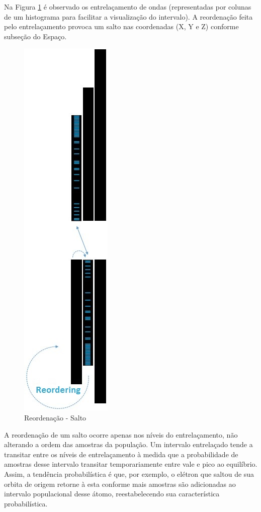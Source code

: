 Na Figura \ref{fig:consciousness_space_subconscious_observation_jump} é observado os entrelaçamento de ondas (representadas por colunas de um histograma para facilitar a visualização do intervalo). A reordenação feita pelo entrelaçamento provoca um salto nas coordenadas (X, Y e Z) conforme subseção do Espaço.
	\begin{figure}[H]
	\caption{Reordenação - Salto}
	\label{fig:consciousness_space_subconscious_observation_jump}
	\centering
	\includegraphics[scale=.53]{sections/images/consciousness_space_subconscious_observation_jump.jpg}
	\end{figure}

A reordenação de um salto ocorre apenas nos níveis do entrelaçamento, não alterando a ordem das amostras da população. Um intervalo entrelaçado tende a transitar entre os níveis de entrelaçamento à medida que a probabilidade de amostras desse intervalo transitar temporariamente entre vale e pico ao equilíbrio. Assim, a tendência probabilística é que, por exemplo, o elétron que saltou de sua orbita de origem retorne à esta conforme mais amostras são adicionadas ao intervalo populacional desse átomo, reestabelecendo sua característica probabilística.

